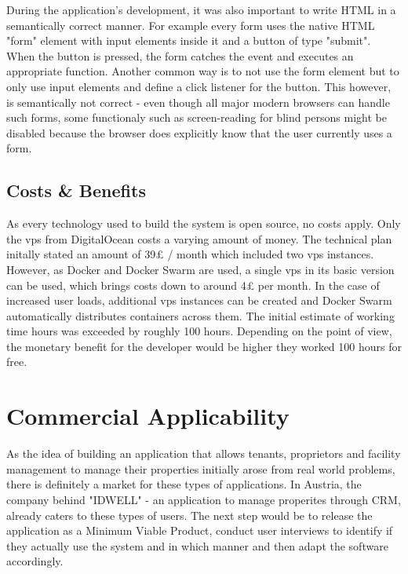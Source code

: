 During the application's development, it was also important to write HTML in a semantically correct manner. For example every form uses the native HTML "form" element with input elements inside it and a button of type "submit". When the button is pressed, the form catches the event and executes an appropriate function. Another common way is to not use the form element but to only use input elements and define a click listener for the button. This however, is semantically not correct - even though all major modern browsers can handle such forms, some functionaly such as screen-reading for blind persons might be disabled because the browser does explicitly know that the user currently uses a form.

\subsection{Costs \& Benefits}
As every technology used to build the system is open source, no costs apply. Only the \acrshort{vps} from DigitalOcean costs a varying amount of money. The technical plan initally stated an amount of 39£ / month which included two \acrshort{vps} instances. However, as Docker and Docker Swarm are used, a single \acrshort{vps} in its basic version can be used, which brings costs down to around 4£ per month. In the case of increased user loads, additional \acrshort{vps} instances can be created and Docker Swarm automatically distributes containers across them. The initial estimate of working time hours was exceeded by roughly 100 hours. Depending on the point of view, the monetary benefit for the developer would be higher they worked 100 hours for free.

\section{Commercial Applicability}
As the idea of building an application that allows tenants, proprietors and facility management to manage their properties initially arose from real world problems, there is definitely a market for these types of applications. In Austria, the company behind "IDWELL" - an application to manage properites through CRM, already caters to these types of users. The next step would be to release the application as a Minimum Viable Product, conduct user interviews to identify if they actually use the system and in which manner and then adapt the software accordingly.


